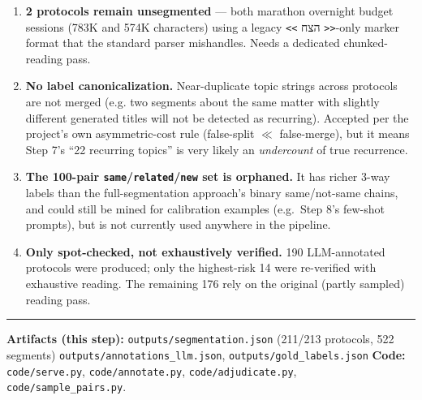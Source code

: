 \documentclass[11pt,a4paper]{article}
\begin{document}
\begin{enumerate}[leftmargin=1.4em]
  \item \textbf{2 protocols remain unsegmented} --- both marathon overnight budget sessions
        (783K and 574K characters) using a legacy \texttt{<{}<} \texthebrew{הצח} \texttt{>{}>}-only marker format
        that the standard parser mishandles. Needs a dedicated chunked-reading pass.
  \item \textbf{No label canonicalization.} Near-duplicate topic strings across protocols are
        not merged (e.g. two segments about the same matter with slightly different generated
        titles will not be detected as recurring). Accepted per the project's own asymmetric-cost
        rule (false-split $\ll$ false-merge), but it means Step 7's ``22 recurring topics'' is
        very likely an \emph{undercount} of true recurrence.
  \item \textbf{The 100-pair \texttt{same}/\texttt{related}/\texttt{new} set is orphaned.} It
        has richer 3-way labels than the full-segmentation approach's binary same/not-same
        chains, and could still be mined for calibration examples (e.g.\ Step 8's few-shot
        prompts), but is not currently used anywhere in the pipeline.
  \item \textbf{Only spot-checked, not exhaustively verified.} 190 LLM-annotated protocols
        were produced; only the highest-risk 14 were re-verified with exhaustive reading. The
        remaining 176 rely on the original (partly sampled) reading pass.
\end{enumerate}

\vspace{1.5em}
\hrule
\vspace{0.4em}
{\small
\textbf{Artifacts (this step):} \newline
\texttt{outputs/segmentation.json} (211/213 protocols, 522 segments) \newline
\texttt{outputs/annotations\_llm.json}, \texttt{outputs/gold\_labels.json} \newline
\textbf{Code:} \texttt{code/serve.py}, \texttt{code/annotate.py}, \texttt{code/adjudicate.py},
\texttt{code/sample\_pairs.py}.
}
\end{document}

